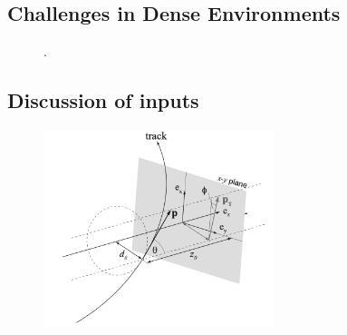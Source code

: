 \subsection{Challenges in Dense Environments}

\begin{figure}[hbt]
\centering
{}
\caption{\cite{jinst-9-2014-P09009}.}
\label{fig:ctide}
\end{figure}


\subsection{Discussion of inputs}


\begin{figure}[hbt]
\centering
\includegraphics[width=0.6\textwidth]{figures/cp-graphics/ATL-SOFT-PUB-2007-003/fig-2a}
\caption{\cite{ATL-SOFT-PUB-2007-003}}
\label{fig:ATL-SOFT-PUB-2007-003-fig-2a}
\end{figure}

